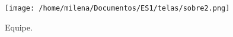 \documentclass[12pt, a4paper]{article}
\begin{document}
\begin{figure}[htb]
	\caption{Equipe.}
	
	\centering %
	\texttt{[image: /home/milena/Documentos/ES1/telas/sobre2.png]} %
	
\end{figure}
\end{document}
